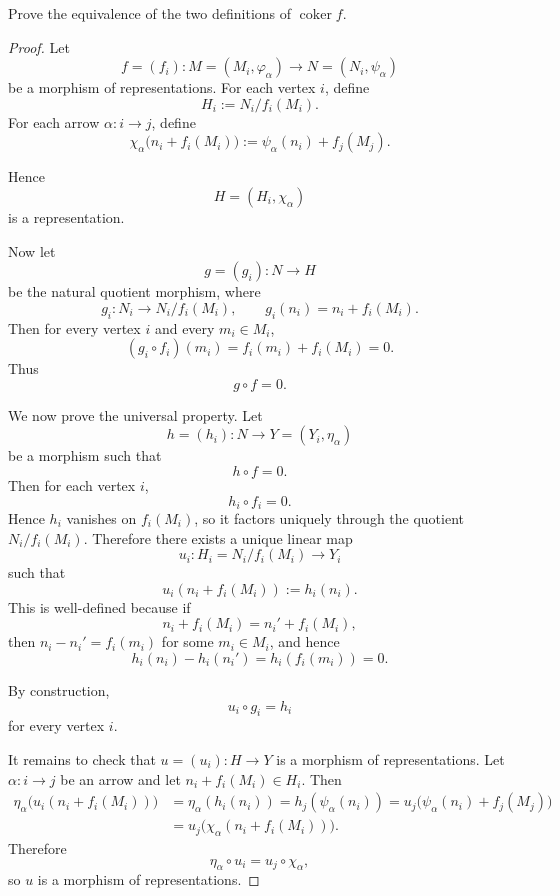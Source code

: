 \documentclass[11pt, a4paper]{report}
\begin{document}
\begin{exercise}
    Prove the equivalence of the two definitions of $\operatorname{coker}f$.
\end{exercise}

\begin{proof}
    Let
    \[
        f=(f_i):M=(M_i,\varphi_\alpha)\to N=(N_i,\psi_\alpha)
    \]
    be a morphism of representations. For each vertex $i$, define
    \[
        H_i:=N_i/f_i(M_i).
    \]
    For each arrow $\alpha:i\to j$, define
    \[
        \chi_\alpha\bigl(n_i+f_i(M_i)\bigr):=\psi_\alpha(n_i)+f_j(M_j).
    \]

    Hence
    \[
        H=(H_i,\chi_\alpha)
    \]
    is a representation.

    Now let
    \[
        g=(g_i):N\to H
    \]
    be the natural quotient morphism, where
    \[
        g_i:N_i\to N_i/f_i(M_i),\qquad g_i(n_i)=n_i+f_i(M_i).
    \]
    Then for every vertex $i$ and every $m_i\in M_i$,
    \[
        (g_i\circ f_i)(m_i)=f_i(m_i)+f_i(M_i)=0.
    \]
    Thus
    \[
        g\circ f=0.
    \]

    We now prove the universal property. Let
    \[
        h=(h_i):N\to Y=(Y_i,\eta_\alpha)
    \]
    be a morphism such that
    \[
        h\circ f=0.
    \]
    Then for each vertex $i$,
    \[
        h_i\circ f_i=0.
    \]
    Hence $h_i$ vanishes on $f_i(M_i)$, so it factors uniquely through the quotient
    $N_i/f_i(M_i)$. Therefore there exists a unique linear map
    \[
        u_i:H_i=N_i/f_i(M_i)\to Y_i
    \]
    such that
    \[
        u_i(n_i+f_i(M_i)):=h_i(n_i).
    \]
    This is well-defined because if
    \[
        n_i+f_i(M_i)=n_i'+f_i(M_i),
    \]
    then $n_i-n_i'=f_i(m_i)$ for some $m_i\in M_i$, and hence
    \[
        h_i(n_i)-h_i(n_i')=h_i(f_i(m_i))=0.
    \]

    By construction,
    \[
        u_i\circ g_i=h_i
    \]
    for every vertex $i$.

    It remains to check that $u=(u_i):H\to Y$ is a morphism of representations.
    Let $\alpha:i\to j$ be an arrow and let $n_i+f_i(M_i)\in H_i$. Then
    \begin{align*}
        \eta_\alpha\bigl(u_i(n_i+f_i(M_i))\bigr)
         & =\eta_\alpha(h_i(n_i))
        =h_j(\psi_\alpha(n_i))
        =u_j\bigl(\psi_\alpha(n_i)+f_j(M_j)\bigr)     \\
         & =u_j\bigl(\chi_\alpha(n_i+f_i(M_i))\bigr).
    \end{align*}
    Therefore
    \[
        \eta_\alpha\circ u_i=u_j\circ \chi_\alpha,
    \]
    so $u$ is a morphism of representations.


\end{proof}
\end{document}
